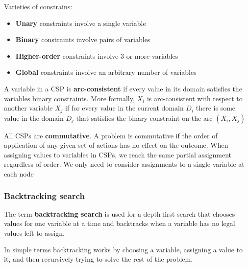 \documentclass{article}
\begin{document}
Varieties of constrains:
\begin{itemize}
    \item \textbf{Unary} constraints involve a single variable
    \item \textbf{Binary} constraints involve pairs of variables
    \item \textbf{Higher-order} constraints involve 3 or more variables
    \item \textbf{Global} constraints involve an arbitrary number of variables
\end{itemize}

A variable in a CSP is \textbf{arc-consistent} if every value in its domain satisfies the variables binary constraints. 
More formally, $X_i$ is arc-consistent with respect to another variable $X_j$ if for every value in the current domain $D_i$ there is some value in the domain $D_j$ that satisfies the binary constraint on the arc $(X_i,X_j)$

All CSPs are \textbf{commutative}. A problem is commutative if the order of application of any given set of actions has no effect on the outcome. When assigning values to variables in CSPs, we reach the same partial assignment regardless of order. We only need to consider assignments to a single variable at each node

\subsubsection{Backtracking search}

The term \textbf{backtracking search} is used for a depth-first search that chooses values for one variable at a time and backtracks when a variable has no legal values left to assign.

In simple terms backtracking works by choosing a variable, assigning a value to it, and then recursively trying to solve the rest of the problem.
\end{document}
